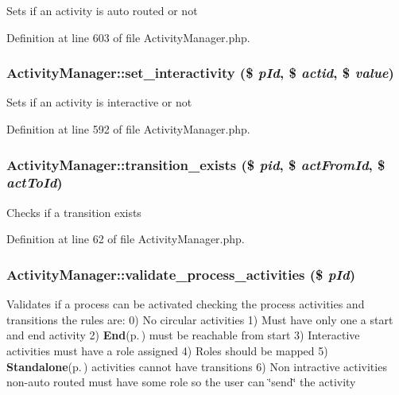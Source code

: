Sets if an activity is auto routed or not 

Definition at line 603 of file Activity\-Manager.php.
\subsubsection{\setlength{\rightskip}{0pt plus 5cm}Activity\-Manager::set\_\-interactivity (\$ {\em p\-Id}, \$ {\em actid}, \$ {\em value})}\label{classActivityManager_a20}


Sets if an activity is interactive or not 

Definition at line 592 of file Activity\-Manager.php.
\subsubsection{\setlength{\rightskip}{0pt plus 5cm}Activity\-Manager::transition\_\-exists (\$ {\em pid}, \$ {\em act\-From\-Id}, \$ {\em act\-To\-Id})}\label{classActivityManager_a5}


Checks if a transition exists 

Definition at line 62 of file Activity\-Manager.php.
\subsubsection{\setlength{\rightskip}{0pt plus 5cm}Activity\-Manager::validate\_\-process\_\-activities (\$ {\em p\-Id})}\label{classActivityManager_a13}


Validates if a process can be activated checking the process activities and transitions the rules are: 0) No circular activities 1) Must have only one a start and end activity 2) {\bf End}{\rm (p.\,\pageref{classEnd})} must be reachable from start 3) Interactive activities must have a role assigned 4) Roles should be mapped 5) {\bf Standalone}{\rm (p.\,\pageref{classStandalone})} activities cannot have transitions 6) Non intractive activities non-auto routed must have some role so the user can \char`\"{}send\char`\"{} the activity 

